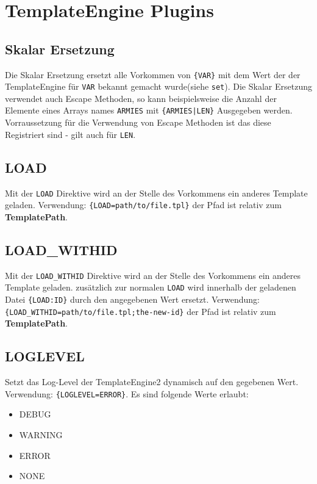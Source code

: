 \documentclass[a4paper,10pt]{article}
\begin{document}
\section{TemplateEngine Plugins}

\subsection{Skalar Ersetzung}
Die Skalar Ersetzung ersetzt alle Vorkommen von {\tt \{VAR\}} mit dem Wert der der TemplateEngine f\"ur {\tt VAR} bekannt
gemacht wurde(siehe {\tt set}). Die Skalar Ersetzung verwendet auch Escape Methoden, so kann beispielsweise die Anzahl
der Elemente eines Arrays names {\tt ARMIES} mit {\tt \{ARMIES|LEN\}} Ausgegeben werden. Vorraussetzung f\"ur die
Verwendung von Escape Methoden ist das diese Registriert sind - gilt auch f\"ur {\tt LEN}.

\subsection{LOAD}
Mit der {\tt LOAD} Direktive wird an der Stelle des Vorkommens ein anderes Template geladen.
Verwendung: {\tt \{LOAD=path/to/file.tpl\}} der Pfad ist relativ zum {\bf TemplatePath}.

\subsection{LOAD\_WITHID}
Mit der {\tt LOAD\_WITHID} Direktive wird an der Stelle des Vorkommens ein anderes Template geladen.
zus\"atzlich zur normalen {\tt LOAD} wird innerhalb der geladenen Datei {\tt \{LOAD:ID\}} durch den angegebenen Wert ersetzt.
Verwendung: {\tt \{LOAD\_WITHID=path/to/file.tpl;the-new-id\}} der Pfad ist relativ zum {\bf TemplatePath}.

\subsection{LOGLEVEL}
Setzt das Log-Level der TemplateEngine2 dynamisch auf den gegebenen Wert. Verwendung: {\tt \{LOGLEVEL=ERROR\}}.
Es sind folgende Werte erlaubt:
\begin{itemize}
 \item DEBUG
 \item WARNING
 \item ERROR
 \item NONE
\end{itemize}
\end{document}
